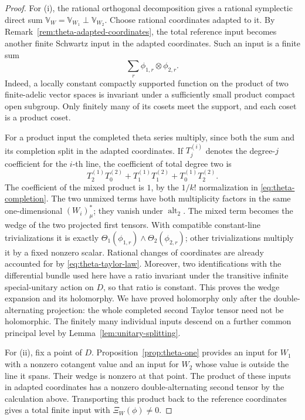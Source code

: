 \begin{proof}
For (i), the rational orthogonal decomposition gives a rational
symplectic direct sum
\(\mathbb V_W=\mathbb V_{W_1}\perp\mathbb V_{W_2}\).
Choose rational coordinates adapted to it.  By
Remark~\ref{rem:theta-adapted-coordinates}, the total reference
input becomes another finite Schwartz input in the adapted
coordinates.  Such an input is a finite sum
\[
 \sum_r\phi_{1,r}\otimes\phi_{2,r}.
\]
Indeed, a locally constant compactly supported function on the
product of two finite-adelic vector spaces is invariant under a
sufficiently small product compact open subgroup.  Only finitely
many of its cosets meet the support, and each coset is a product
coset.

For a product input the completed theta series multiply, since
both the sum and its completion split in the adapted coordinates.
If \(T_j^{(i)}\) denotes the degree-\(j\) coefficient for the
\(i\)-th line, the coefficient of total degree two is
\begin{equation}\label{eq:theta-quadratic-product}
 T_2^{(1)}T_0^{(2)}
       +T_1^{(1)}T_1^{(2)}
       +T_0^{(1)}T_2^{(2)}.
\end{equation}
The coefficient of the mixed product is \(1\), by the
\(1/k!\) normalization in \eqref{eq:theta-completion}.
The two unmixed terms have both multiplicity factors in the
same one-dimensional \((W_i)_\mu^*\); they vanish under
\(\operatorname{alt}_2\).  The mixed term becomes the wedge
of the two projected first tensors.  With compatible
constant-line trivializations it is exactly
\(\Theta_1(\phi_{1,r})\wedge\Theta_2(\phi_{2,r})\);
other trivializations multiply it by a fixed nonzero scalar.
Rational changes of coordinates are already accounted for by
\eqref{eq:theta-taylor-law}.  Moreover, two identifications
with the differential bundle used here have a ratio invariant
under the transitive infinite special-unitary action on \(D\),
so that ratio is constant.  This proves the wedge expansion
and its holomorphy.  We have proved holomorphy only after the
double-alternating projection: the whole completed second
Taylor tensor need not be holomorphic.  The finitely many
individual inputs descend on a further common principal level
by Lemma~\ref{lem:unitary-splitting}.

For (ii), fix a point of \(D\).  Proposition~\ref{prop:theta-one}
provides an input for \(W_1\) with a nonzero cotangent value and
an input for \(W_2\) whose value is outside the line it spans.
Their wedge is nonzero at that point.  The product of these
inputs in adapted coordinates has a nonzero double-alternating
second tensor by the calculation above.  Transporting this
product back to the reference coordinates gives a total finite
input with \(\Xi_W(\phi)\ne0\).


\end{proof}

